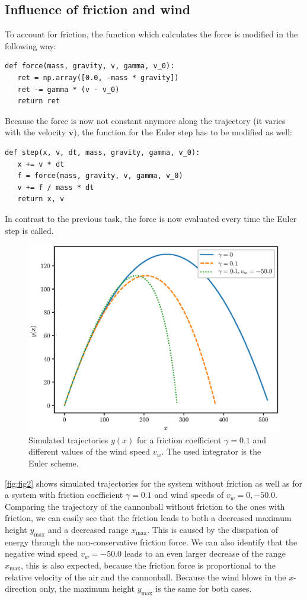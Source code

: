 \documentclass[a4paper,10pt,bibtotoc]{scrartcl}
\begin{document}
\subsection{Influence of friction and wind}
To account for friction, the function which calculates the force is modified in the following way:
\begin{lstlisting}
def force(mass, gravity, v, gamma, v_0):
   ret = np.array([0.0, -mass * gravity])
   ret -= gamma * (v - v_0)
   return ret
\end{lstlisting}
Because the force is now not constant anymore along the trajectory (it varies with the velocity $\mathbf{v}$), the function for the Euler step has to be modified as well:
\begin{lstlisting}
def step(x, v, dt, mass, gravity, gamma, v_0):
   x += v * dt
   f = force(mass, gravity, v, gamma, v_0)
   v += f / mass * dt
   return x, v
\end{lstlisting}
In contrast to the previous task, the force is now evaluated every time the Euler step is called.

\begin{figure}[H]
 \includegraphics[width=\textwidth]{Figure_2.eps}
 \caption{Simulated trajectories $y(x)$ for a friction coefficient $\gamma=0.1$ and different values of the wind speed $v_w$. The used integrator is the Euler scheme.}
 \label{fig:fig2}
\end{figure}

\noindent\autoref{fig:fig2} shows simulated trajectories for the system without friction as well as for a system with friction coefficient $\gamma = 0.1$ and wind speeds of $v_w=0, -50.0$. Comparing the trajectory of the cannonball without friction to the ones with friction, we can easily see that the friction leads to both a decreased maximum height $y_\mathrm{max}$ and a decreased range $x_\mathrm{max}$. This is caused by the disspation of energy through the non-conservative friction force. We can also identify that the negative wind speed $v_w=-50.0$ leads to an even larger decrease of the range $x_\mathrm{max}$, this is also expected, because the friction force is proportional to the relative velocity of the air and the cannonball. Because the wind blows in the $x$-direction only, the maximum height $y_\mathrm{max}$ is the same for both cases.
\end{document}
